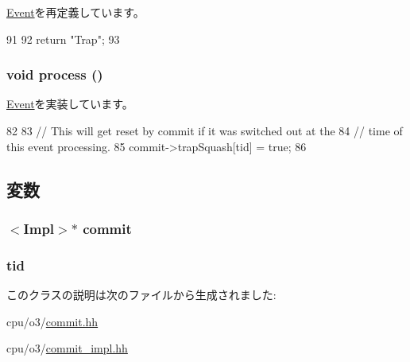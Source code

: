 \hyperlink{classEvent_a130ddddf003422b413e2e891b1b80e8f}{Event}を再定義しています。


\begin{DoxyCode}
91 {
92     return "Trap";
93 }
\end{DoxyCode}
\hypertarget{classDefaultCommit_1_1TrapEvent_a2e9c5136d19b1a95fc427e0852deab5c}{
\subsubsection[{process}]{\setlength{\rightskip}{0pt plus 5cm}void process ()}}
\label{classDefaultCommit_1_1TrapEvent_a2e9c5136d19b1a95fc427e0852deab5c}


\hyperlink{classEvent_a142b75b68a6291400e20fb0dd905b1c8}{Event}を実装しています。


\begin{DoxyCode}
82 {
83     // This will get reset by commit if it was switched out at the
84     // time of this event processing.
85     commit->trapSquash[tid] = true;
86 }
\end{DoxyCode}


\subsection{変数}
\hypertarget{classDefaultCommit_1_1TrapEvent_a9a5f97f5a2b65d6ebf11addf277241aa}{
\subsubsection[{commit}]{$<$Impl$>$$\ast$ {\bf commit}}}
\label{classDefaultCommit_1_1TrapEvent_a9a5f97f5a2b65d6ebf11addf277241aa}
\hypertarget{classDefaultCommit_1_1TrapEvent_aa508770268ee4ceaf16054b9e0be0e17}{
\subsubsection[{tid}]{ {\bf tid}}}
\label{classDefaultCommit_1_1TrapEvent_aa508770268ee4ceaf16054b9e0be0e17}


このクラスの説明は次のファイルから生成されました:\begin{DoxyCompactItemize}
\item 
cpu/o3/\hyperlink{commit_8hh}{commit.hh}\item 
cpu/o3/\hyperlink{commit__impl_8hh}{commit\_\-impl.hh}\end{DoxyCompactItemize}
